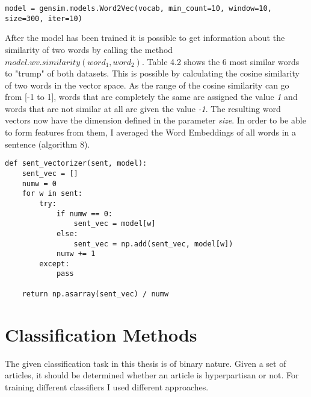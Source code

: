 \documentclass[a4paper, 11pt,titlepage,oneside,openany]{book}
\begin{document}
 \begin{lstlisting}[caption=Word2Vec with gensim]
 model = gensim.models.Word2Vec(vocab, min_count=10, window=10, size=300, iter=10)
 \end{lstlisting}
\indent 
After the model has been trained it is possible to get information about the similarity of two words by calling the method $model.wv.similarity(word_1, word_2)$. Table 4.2 shows the 6 most similar words to "trump" of both datasets. This is possible by calculating the cosine similarity of two words in the vector space. As the range of the cosine similarity can go from [-1 to 1], words that are completely the same are assigned the value \textit{1} and words that are not similar at all are given the value \textit{-1}. 
\newpage
\indent The resulting word vectors now have the dimension defined in the parameter \textit{size}. In order to be able to form features from them, I averaged the Word Embeddings of all words in a sentence (algorithm 8).
\begin{lstlisting}[caption=sent\_vectorizer]
def sent_vectorizer(sent, model):
    sent_vec = []
    numw = 0
    for w in sent:
        try:
            if numw == 0:
                sent_vec = model[w]
            else:
                sent_vec = np.add(sent_vec, model[w])
            numw += 1
        except:
            pass

    return np.asarray(sent_vec) / numw
\end{lstlisting}

\section{Classification Methods}
The given classification task in this thesis is of binary nature. Given a set of articles, it should be determined whether an article is hyperpartisan or not. For training different classifiers I used different approaches. \\
\end{document}
